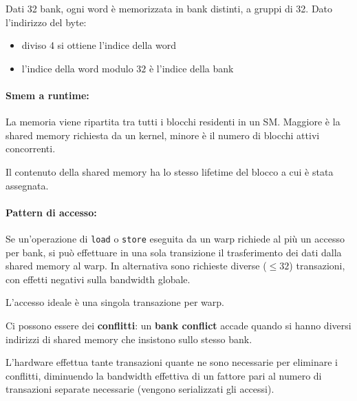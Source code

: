 Dati 32 bank, ogni word è memorizzata in bank distinti, a gruppi di 32. Dato l'indirizzo del byte: 
\begin{itemize}
	\item diviso 4 si ottiene l'indice della word

	\item l'indice della word modulo $32$ è l'indice della bank
\end{itemize}

\paragraph{Smem a runtime:} La memoria viene ripartita tra tutti i blocchi residenti in un SM. Maggiore è la shared memory richiesta da un kernel, minore è il numero di blocchi attivi concorrenti. 

Il contenuto della shared memory ha lo stesso lifetime del blocco a cui è stata assegnata.

\paragraph{Pattern di accesso:} Se un'operazione di \texttt{load} o \texttt{store} eseguita da un warp richiede al più un accesso per bank, si può effettuare in una sola transizione il trasferimento dei dati dalla shared memory al warp. In alternativa sono richieste diverse ($\leq 32$) transazioni, con effetti negativi sulla bandwidth globale.

L'accesso ideale è una singola transazione per warp.

Ci possono essere dei \textbf{conflitti}: un \textbf{bank conflict} accade quando si hanno diversi indirizzi di shared memory che insistono sullo stesso bank.

L'hardware effettua tante transazioni quante ne sono necessarie per eliminare i conflitti, diminuendo la bandwidth effettiva di un fattore pari al numero di transazioni separate necessarie (vengono serializzati gli accessi).

